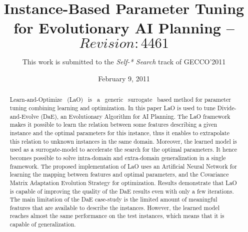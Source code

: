 \documentclass{MYsig-alternate}
\begin{document}
\title{Instance-Based Parameter Tuning\\
for Evolutionary AI Planning -- $Revision: 4461$}


\author{This work is submitted to the {\large \em Self-* Search} track of GECCO'2011}

% 

\date{February 9, 2011}
\maketitle
\begin{abstract}
\noindent Learn-and-Optimize ~(LaO) ~is ~a ~generic ~surrogate ~based method for parameter tuning combining learning and optimization. In this paper LaO is used to tune Divide-and-Evolve (DaE), an Evolutionary Algorithm for AI Planning. The LaO framework makes it possible to learn the relation between some features describing a given instance and the optimal parameters for this instance, thus it enables to extrapolate this relation to unknown instances in the same domain. Moreover, the learned model is used as a surrogate-model to accelerate the search for the optimal parameters. It hence becomes possible to solve intra-domain and extra-domain generalization in a single framework. The proposed implementation of LaO uses an Artificial Neural Network for learning the mapping between features and optimal parameters, and the Covariance Matrix Adaptation Evolution Strategy for optimization. Results demonstrate that LaO is capable of improving the quality of the DaE results even with only a few iterations. The main limitation of the DaE case-study is the limited amount of meaningful features that are available to describe the instances. However, the learned model reaches almost the same performance on the test instances, which means that it is capable of generalization. 

\end{abstract}
\end{document}

